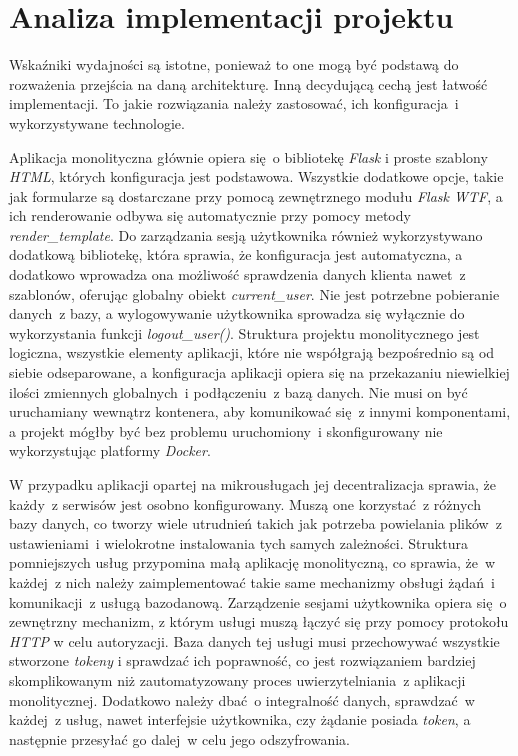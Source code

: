 \section{Analiza implementacji projektu}
Wskaźniki wydajności są istotne, ponieważ to one mogą być podstawą do rozważenia przejścia na daną architekturę. Inną decydującą cechą jest łatwość implementacji. To jakie rozwiązania należy zastosować, ich konfiguracja~i wykorzystywane technologie.

Aplikacja monolityczna głównie opiera się~o bibliotekę \textit{Flask} i proste szablony \textit{HTML}, których konfiguracja jest podstawowa. Wszystkie dodatkowe opcje, takie jak formularze są dostarczane przy pomocą zewnętrznego modułu \textit{Flask WTF}, a ich renderowanie odbywa się automatycznie przy pomocy metody \textit{render\_template}.
Do zarządzania sesją użytkownika również wykorzystywano dodatkową bibliotekę, która sprawia, że konfiguracja jest automatyczna, a dodatkowo wprowadza ona możliwość sprawdzenia danych klienta nawet~z szablonów, oferując globalny obiekt \textit{current\_user}. Nie jest potrzebne pobieranie danych~z bazy, a wylogowywanie użytkownika sprowadza się wyłącznie do wykorzystania funkcji \textit{logout\_user()}. 
Struktura projektu monolitycznego jest logiczna, wszystkie elementy aplikacji, które nie współgrają bezpośrednio są od siebie odseparowane, a konfiguracja aplikacji opiera się na przekazaniu niewielkiej ilości zmiennych globalnych~i podłączeniu~z bazą danych. Nie musi on być uruchamiany wewnątrz kontenera, aby komunikować się~z innymi komponentami, a projekt mógłby być bez problemu uruchomiony~i skonfigurowany nie wykorzystując platformy \textit{Docker}.

W przypadku aplikacji opartej na mikrousługach jej decentralizacja sprawia, że każdy~z serwisów jest osobno konfigurowany. Muszą one korzystać~z różnych bazy danych, co tworzy wiele utrudnień takich jak potrzeba powielania plików~z ustawieniami~i wielokrotne instalowania tych samych zależności. Struktura pomniejszych usług przypomina małą aplikację monolityczną, co sprawia, że~w każdej~z nich należy zaimplementować takie same mechanizmy obsługi żądań~i komunikacji~z usługą bazodanową. Zarządzenie sesjami użytkownika opiera się~o zewnętrzny mechanizm, z którym usługi muszą łączyć się przy pomocy protokołu \textit{HTTP} w celu autoryzacji. Baza danych tej usługi musi przechowywać wszystkie stworzone \textit{tokeny} i sprawdzać ich poprawność, co jest rozwiązaniem bardziej skomplikowanym niż zautomatyzowany proces uwierzytelniania~z aplikacji monolitycznej. Dodatkowo należy dbać~o integralność danych, sprawdzać~w każdej~z usług, nawet interfejsie użytkownika, czy żądanie posiada \textit{token}, a następnie przesyłać go dalej~w celu jego odszyfrowania.

